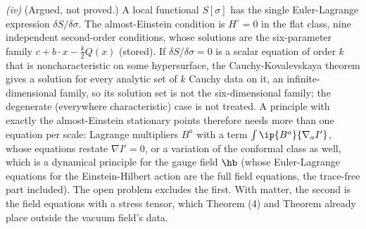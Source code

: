 \emph{(iv)} (Argued, not proved.) A local functional $S[\sigma]$ has the single Euler-Lagrange expression $\delta S/\delta\sigma$. The almost-Einstein condition is $H^{\circ} = 0$ in the flat class, nine independent second-order conditions, whose solutions are the six-parameter family $c + b\cdot x - \tfrac{k}{2}Q(x)$ (stored). If $\delta S/\delta\sigma = 0$ is a scalar equation of order $k$ that is noncharacteristic on some hypersurface, the Cauchy-Kovalevskaya theorem gives a solution for every analytic set of $k$ Cauchy data on it, an infinite-dimensional family, so its solution set is not the six-dimensional family; the degenerate (everywhere characteristic) case is not treated. A principle with exactly the almost-Einstein stationary points therefore needs more than one equation per scale: Lagrange multipliers $B^{a}$ with a term $\int\ip{B^{a}}{\nabla_{a}I'}$, whose equations restate $\nabla I' = 0$, or a variation of the conformal class as well, which is a dynamical principle for the gauge field $\hb$ (whose Euler-Lagrange equations for the Einstein-Hilbert action are the full field equations, the trace-free part included). The open problem excludes the first. With matter, the second is the field equations with a stress tensor, which Theorem (4) and Theorem  already place outside the vacuum field's data.
